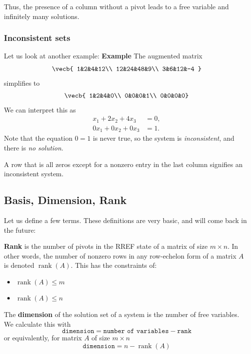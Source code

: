 Thus, the presence of a column without a pivot leads to a free variable and infinitely many solutions.

\subsubsection{Inconsistent sets}
Let us look at another example:
\textbf{Example}
The augmented matrix
$$\vecb{
1&2&4&12\\
12&24&48&9\\
3&6&12&-4
}$$
simplifies to 
$$\vecb{
1&2&4&0\\
0&0&0&1\\
0&0&0&0}$$
We can interpret this as
$$\begin{aligned}
x_1 + 2x_2 + 4x_3 &= 0,\\
0x_1 + 0x_2 + 0x_3 &= 1.
\end{aligned}$$
Note that the equation $0=1$ is never true, so the system is \emph{inconsistent}, and there is \emph{no solution}.

A row that is all zeros except for a nonzero entry in the last column signifies an inconsistent system.


\subsection{Basis, Dimension, Rank}
Let us define a few terms. These definitions are very basic, and will come back in the future:

\begin{mdframed}[frametitle = {Rank}, style = important]
\textbf{Rank} is the number of pivots in the RREF state of a matrix of size $m \times n$.
In other words, the number of nonzero rows in any row-echelon form of a matrix $A$ is denoted $\operatorname{rank}(A)$.
This has the constraints of:
\begin{itemize}
       \item $\operatorname{rank}(A) \le m$
       \item $\operatorname{rank}(A) \le n$
\end{itemize}
\end{mdframed}

\begin{mdframed}[frametitle = {Dimension}, style = important]
The \textbf{dimension} of the solution set of a system is the number of free variables. 
We calculate this with
$$\texttt{dimension} = \texttt{number of variables}-\texttt{rank}$$
or equivalently, for matrix $A$ of size $m \times n$
$$\texttt{dimension} = n - \operatorname{rank}(A)$$
\end{mdframed}

